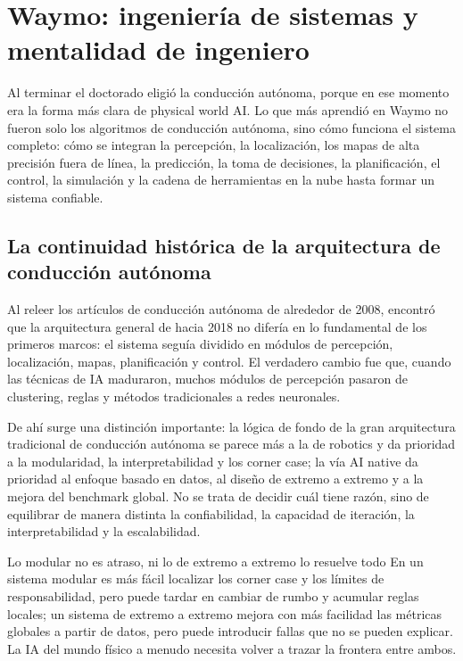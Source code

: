 \section{Waymo: ingeniería de sistemas y mentalidad de ingeniero}

Al terminar el doctorado eligió la conducción autónoma, porque en ese momento era la forma más clara de physical world AI. Lo que más aprendió en Waymo no fueron solo los algoritmos de conducción autónoma, sino cómo funciona el sistema completo: cómo se integran la percepción, la localización, los mapas de alta precisión fuera de línea, la predicción, la toma de decisiones, la planificación, el control, la simulación y la cadena de herramientas en la nube hasta formar un sistema confiable.

\subsection{La continuidad histórica de la arquitectura de conducción autónoma}

Al releer los artículos de conducción autónoma de alrededor de 2008, encontró que la arquitectura general de hacia 2018 no difería en lo fundamental de los primeros marcos: el sistema seguía dividido en módulos de percepción, localización, mapas, planificación y control. El verdadero cambio fue que, cuando las técnicas de IA maduraron, muchos módulos de percepción pasaron de clustering, reglas y métodos tradicionales a redes neuronales.

De ahí surge una distinción importante: la lógica de fondo de la gran arquitectura tradicional de conducción autónoma se parece más a la de robotics y da prioridad a la modularidad, la interpretabilidad y los corner case; la vía AI native da prioridad al enfoque basado en datos, al diseño de extremo a extremo y a la mejora del benchmark global. No se trata de decidir cuál tiene razón, sino de equilibrar de manera distinta la confiabilidad, la capacidad de iteración, la interpretabilidad y la escalabilidad.

\begin{warningbox}{Lo modular no es atraso, ni lo de extremo a extremo lo resuelve todo}
En un sistema modular es más fácil localizar los corner case y los límites de responsabilidad, pero puede tardar en cambiar de rumbo y acumular reglas locales; un sistema de extremo a extremo mejora con más facilidad las métricas globales a partir de datos, pero puede introducir fallas que no se pueden explicar. La IA del mundo físico a menudo necesita volver a trazar la frontera entre ambos.
\end{warningbox}

